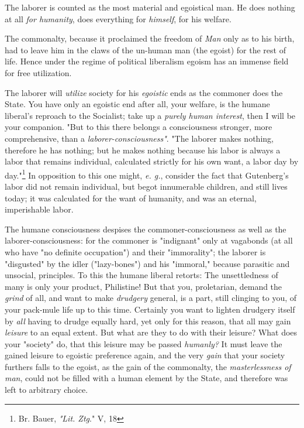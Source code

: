 \documentclass[a4paper]{book}
\begin{document}
The laborer is counted as the most material and egoistical man. He does 
nothing at all \textit{for humanity}, does everything for \textit{himself}, 
for his welfare.

The commonalty, because it proclaimed the freedom of \textit{Man} only as to 
his birth, had to leave him in the claws of the un-human man (the egoist) for 
the rest of life. Hence under the regime of political liberalism egoism has an 
immense field for free utilization.

The laborer will \textit{utilize} society for his \textit{egoistic} ends as 
the commoner does the State. You have only an egoistic end after all, your 
welfare, is the humane liberal's reproach to the Socialist; take up a 
\textit{purely human interest}, then I will be your companion. "{}But to this 
there belongs a consciousness stronger, more comprehensive, than a 
\textit{laborer-consciousness"{}}. "{}The laborer makes nothing, therefore he 
has nothing; but he makes nothing because his labor is always a labor that 
remains individual, calculated strictly for his own want, a labor day by 
day."{}\footnote{Br. Bauer, \textit{"{}Lit. Ztg}."{} V, 18} In opposition to 
this one might, \textit{e. g.}, consider the fact that Gutenberg's labor did 
not remain individual, but begot innumerable children, and still lives today; 
it was calculated for the want of humanity, and was an eternal, imperishable 
labor.

The humane consciousness despises the commoner-consciousness as well as the 
laborer-consciousness: for the commoner is "{}indignant"{} only at vagabonds 
(at all who have "{}no definite occupation"{}) and their "{}immorality"{}; the 
laborer is "{}disgusted"{} by the idler ("{}lazy-bones"{}) and his 
"{}immoral,"{} because parasitic and unsocial, principles. To this the humane 
liberal retorts: The unsettledness of many is only your product, Philistine! 
But that you, proletarian, demand the \textit{grind} of all, and want to make 
\textit{drudgery} general, is a part, still clinging to you, of your pack-mule 
life up to this time. Certainly you want to lighten drudgery itself by 
\textit{all} having to drudge equally hard, yet only for this reason, that all 
may gain \textit{leisure} to an equal extent. But what are they to do with 
their leisure? What does your "{}society"{} do, that this leisure may be 
passed \textit{humanly?} It must leave the gained leisure to egoistic 
preference again, and the very \textit{gain} that your society furthers falls 
to the egoist, as the gain of the commonalty, the \textit{masterlessness of 
man}, could not be filled with a human element by the State, and therefore was 
left to arbitrary choice.
\end{document}
